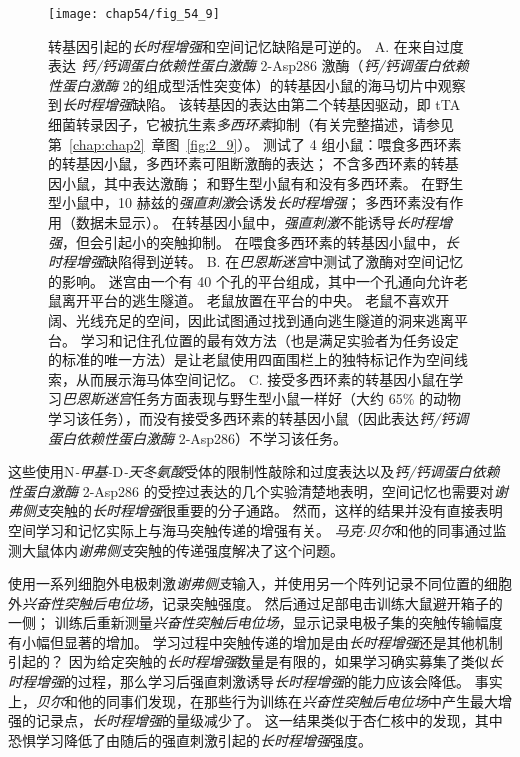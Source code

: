 \begin{figure}[htbp]
	\centering
	\texttt{[image: chap54/fig\_54\_9]}
	\caption{转基因引起的\textit{长时程增强}和空间记忆缺陷是可逆的。
		A. 在来自过度表达 \textit{钙/钙调蛋白依赖性蛋白激酶} 2-Asp286 激酶（\textit{钙/钙调蛋白依赖性蛋白激酶} 2的组成型活性突变体）的转基因小鼠的海马切片中观察到\textit{长时程增强}缺陷。
		该转基因的表达由第二个转基因驱动，即 tTA 细菌转录因子，它被抗生素\textit{多西环素}抑制（有关完整描述，请参见第~\ref{chap:chap2}~章图~\ref{fig:2_9}）。
		测试了 4 组小鼠：喂食多西环素的转基因小鼠，多西环素可阻断激酶的表达；
		不含多西环素的转基因小鼠，其中表达激酶；
		和野生型小鼠有和没有多西环素。
		在野生型小鼠中，10 赫兹的\textit{强直刺激}会诱发\textit{长时程增强}；
		多西环素没有作用（数据未显示）。
		在转基因小鼠中，\textit{强直刺激}不能诱导\textit{长时程增强}，但会引起小的突触抑制。
		在喂食多西环素的转基因小鼠中，\textit{长时程增强}缺陷得到逆转。
		B. 在\textit{巴恩斯迷宫}中测试了激酶对空间记忆的影响。
		迷宫由一个有 40 个孔的平台组成，其中一个孔通向允许老鼠离开平台的逃生隧道。
		老鼠放置在平台的中央。
		老鼠不喜欢开阔、光线充足的空间，因此试图通过找到通向逃生隧道的洞来逃离平台。
		学习和记住孔位置的最有效方法（也是满足实验者为任务设定的标准的唯一方法）是让老鼠使用四面围栏上的独特标记作为空间线索，从而展示海马体空间记忆。
		C. 接受多西环素的转基因小鼠在学习\textit{巴恩斯迷宫}任务方面表现与野生型小鼠一样好（大约 65\% 的动物学习该任务），而没有接受多西环素的转基因小鼠（因此表达\textit{钙/钙调蛋白依赖性蛋白激酶} 2-Asp286）不学习该任务。}
	\label{fig:54_9}
\end{figure}


这些使用N\textit{-甲基-}D\textit{-天冬氨酸}受体的限制性敲除和过度表达以及\textit{钙/钙调蛋白依赖性蛋白激酶} 2-Asp286 的受控过表达的几个实验清楚地表明，空间记忆也需要对\textit{谢弗侧支}突触的\textit{长时程增强}很重要的分子通路。
然而，这样的结果并没有直接表明空间学习和记忆实际上与海马突触传递的增强有关。
\textit{马克$\cdot$贝尔}和他的同事通过监测大鼠体内\textit{谢弗侧支}突触的传递强度解决了这个问题。


使用一系列细胞外电极刺激\textit{谢弗侧支}输入，并使用另一个阵列记录不同位置的细胞外\textit{兴奋性突触后电位场}，记录突触强度。
然后通过足部电击训练大鼠避开箱子的一侧；
训练后重新测量\textit{兴奋性突触后电位场}，显示记录电极子集的突触传输幅度有小幅但显著的增加。
学习过程中突触传递的增加是由\textit{长时程增强}还是其他机制引起的？
因为给定突触的\textit{长时程增强}数量是有限的，如果学习确实募集了类似\textit{长时程增强}的过程，那么学习后强直刺激诱导\textit{长时程增强}的能力应该会降低。
事实上，\textit{贝尔}和他的同事们发现，在那些行为训练在\textit{兴奋性突触后电位场}中产生最大增强的记录点，\textit{长时程增强}的量级减少了。
这一结果类似于杏仁核中的发现，其中恐惧学习降低了由随后的强直刺激引起的\textit{长时程增强}强度。


